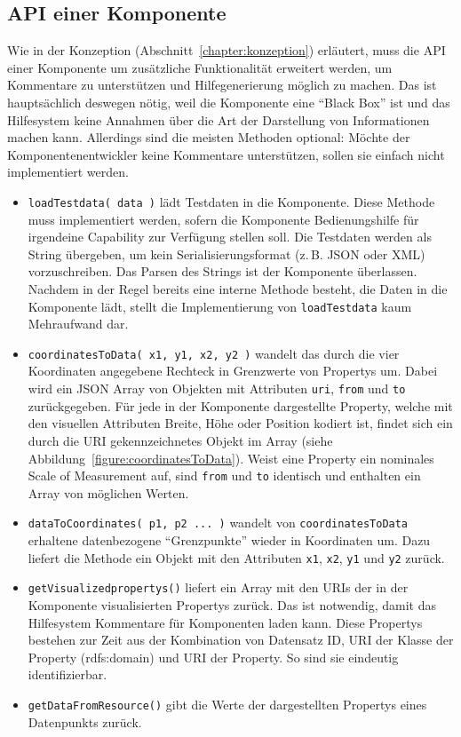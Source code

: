 \documentclass[
	headsepline,
	footsepline,
	fontsize=12pt,
	bibliography=totoc
]{scrbook}
\begin{document}
\subsection{API einer Komponente}
\label{section:implementierung:frontend:api}

Wie in der Konzeption (Abschnitt~\ref{chapter:konzeption}) erläutert, muss die API einer Komponente um zusätzliche Funktionalität erweitert werden, um Kommentare zu unterstützen und Hilfegenerierung möglich zu machen. Das ist hauptsächlich deswegen nötig, weil die Komponente eine \enquote{Black Box} ist und das Hilfesystem keine Annahmen über die Art der Darstellung von Informationen machen kann. Allerdings sind die meisten Methoden optional: Möchte der Komponentenentwickler keine Kommentare unterstützen, sollen sie einfach nicht implementiert werden.

\begin{itemize}
	\item \texttt{loadTestdata( data )} lädt Testdaten in die Komponente. Diese Methode muss implementiert werden, sofern die Komponente Bedienungshilfe für irgendeine Capability zur Verfügung stellen soll. Die Testdaten werden als String übergeben, um kein Serialisierungsformat (z.\,B. JSON oder XML) vorzuschreiben. Das Parsen des Strings ist der Komponente überlassen. Nachdem in der Regel bereits eine interne Methode besteht, die Daten in die Komponente lädt, stellt die Implementierung von \texttt{loadTestdata} kaum Mehraufwand dar.
	\item \texttt{coordinatesToData( x1, y1, x2, y2 )} wandelt das durch die vier Koordinaten angegebene Rechteck in Grenzwerte von Propertys um. Dabei wird ein JSON Array von Objekten mit Attributen \texttt{uri}, \texttt{from} und \texttt{to} zurückgegeben. Für jede in der Komponente dargestellte Property, welche mit den visuellen Attributen Breite, Höhe oder Position kodiert ist, findet sich ein durch die URI gekennzeichnetes Objekt im Array (siehe Abbildung~\ref{figure:coordinatesToData}). Weist eine Property ein nominales Scale of Measurement auf, sind \texttt{from} und \texttt{to} identisch und enthalten ein Array von möglichen Werten.
	\item \texttt{dataToCoordinates( p1, p2 ... )} wandelt von \texttt{coordinatesToData} erhaltene datenbezogene \enquote{Grenzpunkte} wieder in Koordinaten um. Dazu liefert die Methode ein Objekt mit den Attributen \texttt{x1}, \texttt{x2}, \texttt{y1} und \texttt{y2} zurück.
	\item \texttt{getVisualizedpropertys()} liefert ein Array mit den URIs der in der Komponente visualisierten Propertys zurück. Das ist notwendig, damit das Hilfesystem Kommentare für Komponenten laden kann. Diese Propertys bestehen zur Zeit aus der Kombination von Datensatz ID, URI der Klasse der Property (rdfs:domain) und URI der Property. So sind sie eindeutig identifizierbar.
	\item \texttt{getDataFromResource()} gibt die Werte der dargestellten Propertys eines Datenpunkts zurück.
\end{itemize}
\end{document}
